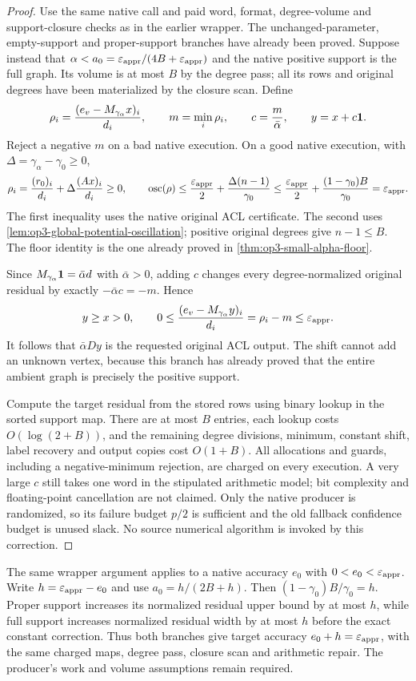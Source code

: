\begin{proof}
Use the same native call and paid word, format, degree-volume and
support-closure checks as in the earlier wrapper. The unchanged-parameter,
empty-support and proper-support branches have already been proved.
Suppose instead that $\alpha<a_0=\varepsilon_{\mathrm{appr}}/(4B+\varepsilon_{\mathrm{appr}})$ and the
native positive support is the full graph. Its volume is at most $B$
by the degree pass; all its rows and original degrees have been
materialized by the closure scan. Define
\[
 \rho_i=\frac{(e_v-M_{\gamma_\alpha}x)_i}{d_i},\qquad
 m=\min_i\rho_i,\qquad c=\frac{m}{\bar\alpha},\qquad
 y=x+c\mathbf{1}.
\]
Reject a negative $m$ on a bad native execution. On a good native
execution, with $\Delta=\gamma_\alpha-\gamma_0\geq0$,
\[
 \rho_i=\frac{(r_0)_i}{d_i}+\Delta\frac{(Ax)_i}{d_i}\geq0,
 \qquad
 \operatorname{osc}(\rho)
 \leq\frac{\varepsilon_{\mathrm{appr}}}{2}
      +\frac{\Delta(n-1)}{\gamma_0}
 \leq\frac{\varepsilon_{\mathrm{appr}}}{2}
      +\frac{(1-\gamma_0)B}{\gamma_0}
 =\varepsilon_{\mathrm{appr}}.
\]
The first inequality uses the native original ACL certificate. The
second uses \cref{lem:op3-global-potential-oscillation}; positive
original degrees give $n-1\leq B$. The floor identity is the one
already proved in \cref{thm:op3-small-alpha-floor}.

Since $M_{\gamma_\alpha}\mathbf{1}=\bar\alpha d$ with $\bar\alpha>0$,
adding $c$ changes every degree-normalized original residual by exactly
$-\bar\alpha c=-m$. Hence
\[
 y\geq x>0,\qquad
 0\leq\frac{(e_v-M_{\gamma_\alpha}y)_i}{d_i}
      =\rho_i-m\leq\varepsilon_{\mathrm{appr}}.
\]
It follows that $\bar\alpha Dy$ is the requested original ACL output.
The shift cannot add an unknown vertex, because this branch has already
proved that the entire ambient graph is precisely the positive support.

Compute the target residual from the stored rows using binary lookup
in the sorted support map. There are at most $B$ entries, each lookup
costs $O(\log(2+B))$, and the remaining degree divisions, minimum,
constant shift, label recovery and output copies cost $O(1+B)$.
All allocations and guards, including a negative-minimum rejection,
are charged on every execution. A very large $c$ still takes one word
in the stipulated arithmetic model; bit complexity and floating-point
cancellation are not claimed. Only the native producer is randomized,
so its failure budget $p/2$ is sufficient and the old fallback confidence
budget is unused slack. No source numerical algorithm is invoked by
this correction.
\end{proof}

\begin{corollary}
\label{cor:op3-general-residual-margin-floor}
The same wrapper argument applies to a native accuracy $e_0$ with
$0<e_0<\varepsilon_{\mathrm{appr}}$. Write $h=\varepsilon_{\mathrm{appr}}-e_0$ and use
$a_0=h/(2B+h)$. Then $(1-\gamma_0)B/\gamma_0=h$.
Proper support increases its normalized residual upper bound by at
most $h$, while full support increases normalized residual width by at
most $h$ before the exact constant correction. Thus both branches
give target accuracy $e_0+h=\varepsilon_{\mathrm{appr}}$, with the same charged maps,
degree pass, closure scan and arithmetic repair. The producer's work
and volume assumptions remain required.
\end{corollary}

